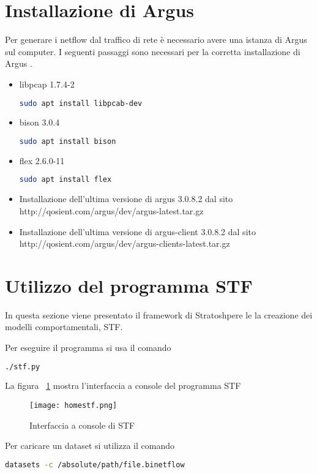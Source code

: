 \documentclass[../main.tex]{subfiles}
\begin{document}
\section{Installazione di Argus}

Per generare i netflow dal traffico di rete è necessario avere una istanza di Argus sul computer. I seguenti passaggi sono necessari per la corretta installazione di Argus \cite{stf}.
\begin{itemize}
				\item libpcap 1.7.4-2
\begin{lstlisting}[language=bash]
 sudo apt install libpcab-dev
\end{lstlisting}
\item bison 3.0.4
\begin{lstlisting}[language=bash]
 sudo apt install bison
\end{lstlisting}
\item flex 2.6.0-11
\begin{lstlisting}[language=bash]
 sudo apt install flex
\end{lstlisting}
\item Installazione dell'ultima versione di argus 3.0.8.2 dal sito http://qosient.com/argus/dev/argus-latest.tar.gz
\item Installazione dell'ultima versione di argus-client 3.0.8.2 dal sito http://qosient.com/argus/dev/argus-clients-latest.tar.gz
\end{itemize}

\section{Utilizzo del programma STF\\}
In questa sezione viene presentato il framework di Stratoshpere le la creazione dei modelli comportamentali, STF. 

Per eseguire il programma si usa il comando
\begin{lstlisting}[language=bash]
	./stf.py
\end{lstlisting}
La figura ~\ref{fig:homestf} mostra l'interfaccia a console del programma STF
\begin{figure}[H]
				\centering
				\texttt{[image: homestf.png]}
				\caption{Interfaccia a console di STF}
				\label{fig:homestf}
\end{figure}

Per caricare un dataset si utilizza il comando
\begin{lstlisting}[language=bash]
	datasets -c /absolute/path/file.binetflow	
\end{lstlisting}
\end{document}

